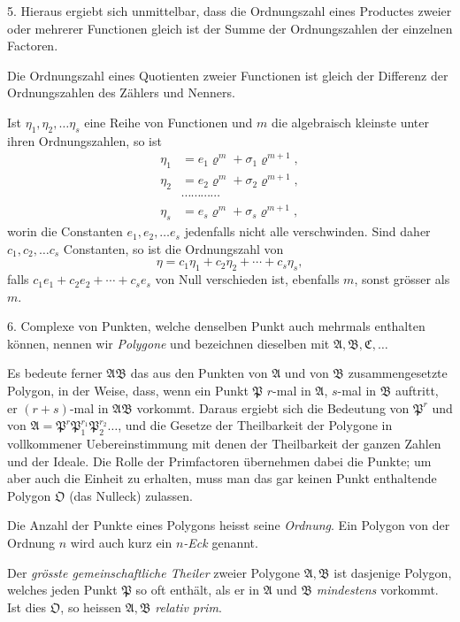 \documentclass{article}
\begin{document}
5. Hieraus ergiebt sich unmittelbar, dass die Ordnungszahl eines Productes zweier oder mehrerer Functionen gleich ist der Summe der Ordnungszahlen der einzelnen Factoren.

Die Ordnungszahl eines Quotienten zweier Functionen ist gleich der Differenz der Ordnungszahlen des Zählers und Nenners.

Ist $\eta_{1}, \eta_{2}, \ldots \eta_{s}$ eine Reihe von Functionen und $m$ die algebraisch kleinste unter ihren Ordnungszahlen, so ist
\[ \begin{aligned} \eta_{1} &= e_{1}\varrho^{m} + \sigma_{1}\varrho^{m+1}, \\ \eta_{2} &= e_{2}\varrho^{m} + \sigma_{2}\varrho^{m+1}, \\ &\cdots\cdots\cdots\cdots \\ \eta_{s} &= e_{s}\varrho^{m} + \sigma_{s}\varrho^{m+1}, \end{aligned} \]
worin die Constanten $e_{1}, e_{2}, \ldots e_{s}$ jedenfalls nicht alle verschwinden. Sind daher $c_{1}, c_{2}, \ldots c_{s}$ Constanten, so ist die Ordnungszahl von
\[ \eta = c_{1}\eta_{1} + c_{2}\eta_{2} + \cdots + c_{s}\eta_{s}, \]
falls $c_{1}e_{1} + c_{2}e_{2} + \cdots + c_{s}e_{s}$ von Null verschieden ist, ebenfalls $m$, sonst grösser als $m$.

6. Complexe von Punkten, welche denselben Punkt auch mehrmals enthalten können, nennen wir \emph{Polygone} und bezeichnen dieselben mit $\mathfrak{A}, \mathfrak{B}, \mathfrak{C}, \ldots$

Es bedeute ferner $\mathfrak{A}\mathfrak{B}$ das aus den Punkten von $\mathfrak{A}$ und von $\mathfrak{B}$ zusammengesetzte Polygon, in der Weise, dass, wenn ein Punkt $\mathfrak{P}$ $r$-mal in $\mathfrak{A}$, $s$-mal in $\mathfrak{B}$ auftritt, er $(r+s)$-mal in $\mathfrak{A}\mathfrak{B}$ vorkommt. Daraus ergiebt sich die Bedeutung von $\mathfrak{P}^{r}$ und von $\mathfrak{A} = \mathfrak{P}^{r}\mathfrak{P}_{1}^{r_{1}}\mathfrak{P}_{2}^{r_{2}}\ldots$, und die Gesetze der Theilbarkeit der Polygone in vollkommener Uebereinstimmung mit denen der Theilbarkeit der ganzen Zahlen und der Ideale. Die Rolle der Primfactoren übernehmen dabei die Punkte; um aber auch die Einheit zu erhalten, muss man das gar keinen Punkt enthaltende Polygon $\mathfrak{O}$ (das Nulleck) zulassen.

Die Anzahl der Punkte eines Polygons heisst seine \emph{Ordnung}. Ein Polygon von der Ordnung $n$ wird auch kurz ein \emph{$n$-Eck} genannt.

Der \emph{grösste gemeinschaftliche Theiler} zweier Polygone $\mathfrak{A}, \mathfrak{B}$ ist dasjenige Polygon, welches jeden Punkt $\mathfrak{P}$ so oft enthält, als er in $\mathfrak{A}$ und $\mathfrak{B}$ \emph{mindestens} vorkommt. Ist dies $\mathfrak{O}$, so heissen $\mathfrak{A}, \mathfrak{B}$ \emph{relativ prim}.
\end{document}
